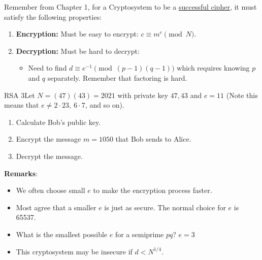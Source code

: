 Remember from Chapter 1, for a Cryptosystem to be a \hyperlink{Successful Ciphers}{successful cipher}, it must satisfy the following properties:

\begin{enumerate}
    \item \textbf{Encryption:} Must be easy to encrypt: \(c \equiv m^e \pmod{N}\).
    \item \textbf{Decryption:} Must be hard to decrypt:
          \begin{itemize}
              \item Need to find \(d \equiv e^{-1}\pmod{(p-1)(q-1)}\) which requires knowing \(p\) and \(q\) separately. Remember that factoring is hard.
          \end{itemize}
\end{enumerate}

\begin{example}
    {RSA 3}Let \(N = (47)(43) = 2021\) with private key \(47,43\) and \(e = 11\) (Note this means that \(e \ne 2 \cdot 23, \ 6 \cdot 7\), and so on). \begin{enumerate}[label=(\alph*)]
        \item Calculate Bob's public key.
        \item Encrypt the message \(m = 1050\) that Bob sends to Alice.
        \item Decrypt the message.
    \end{enumerate}
\end{example}


\begin{center}
    \textbf{Remarks}:
\end{center}
\begin{itemize}
    \item We often choose small \(e\) to make the encryption process faster.
    \item Most agree that a smaller \(e\) is just as secure. The normal choice for \(e\) is 65537.
    \item What is the smallest possible \(e\) for a semiprime \(pq\)? \(e = 3\)
    \item This cryptosystem may be insecure if \(d < N^{1/4}\).
\end{itemize}

